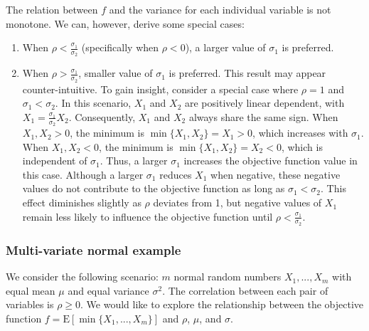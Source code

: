 \documentclass[opre,sglanonrev]{informs4}
\begin{document}
The relation between $f$ and the variance for each individual variable is not monotone. We can, however, derive some special cases:
	\begin{enumerate}
		\item When $\rho<\frac{\sigma_1}{\sigma_2}$ (specifically when $\rho<0$), a larger value of $\sigma_1$ is preferred.
		\item When $\rho>\frac{\sigma_1}{\sigma_2}$, smaller value of $\sigma_1$ is preferred. This result may appear counter-intuitive. To gain insight, consider a special case where $\rho = 1$ and $\sigma_1<\sigma_2$. In this scenario, $X_1$ and $X_2$ are positively linear dependent, with $ X_1 = \frac{\sigma_1}{\sigma_2} X_2$. Consequently, $X_1$ and $X_2$ always share the same sign. When $X_1, X_2 > 0$, the minimum is $\min\{X_1, X_2\} = X_1 > 0$, which increases with $\sigma_1$. When $X_1, X_2 < 0$, the minimum is $\min\{X_1, X_2\} = X_2 < 0$, which is independent of $\sigma_1$. Thus, a larger $\sigma_1$ increases the objective function value in this case. Although a larger $\sigma_1$ reduces $X_1$ when negative, these negative values do not contribute to the objective function as long as $\sigma_1 < \sigma_2$. This effect diminishes slightly as $\rho$ deviates from 1, but negative values of $X_1$ remain less likely to influence the objective function until $\rho < \frac{\sigma_1}{\sigma_2}$.
		
	\end{enumerate}


\subsubsection{Multi-variate normal example}
\label{multi-variate}

We consider the following scenario: $m$ normal random numbers $X_1,...,X_m$ with equal mean $\mu$ and equal variance $\sigma^2$. The correlation between each pair of variables is $\rho\geq 0$. We would like to explore the relationship between the objective function  $f = \text{E}[\min\{X_1,...,X_m\}]$ and $\rho$, $\mu$, and $\sigma$.
\end{document}
